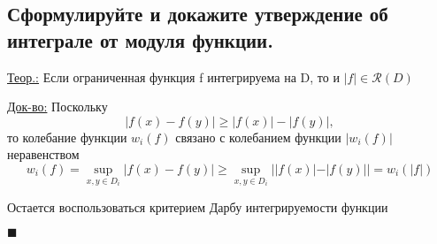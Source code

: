 
\subsection{Сформулируйте и докажите утверждение об интеграле от модуля функции.}
\underline{Теор.:} 
    Если ограниченная функция f интегрируема на D, то и $|f| \in \mathcal{R}(D)$


\underline{Док-во:} 
    Поскольку \[ |f(x) - f(y)| \geq |f(x)| - |f(y)|,\] то колебание функции $w_i(f)$ связано с колебанием функции $|w_i(f)|$ неравенством \[w_i(f) = \sup\limits_{x, y \in D_i} |f(x) - f(y)| \geq \sup\limits_{x, y \in D_i} ||f(x)| - |f(y)|| = w_i(|f|)\]
    
    Остается воспользоваться критерием Дарбу интегрируемости функции
    \begin{flushright}
    $\blacksquare$
    \end{flushright}



